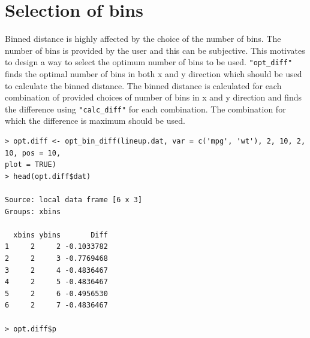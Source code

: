 \documentclass[article]{jss}
\begin{document}
\section{Selection of bins}\label{select-bins}

Binned distance is highly affected by the choice of the number of bins.
The number of bins is provided by the user and this can be subjective.
This motivates to design a way to select the optimum number of bins to
be used. \texttt{"opt\_diff"} finds the optimal number of bins in both x
and y direction which should be used to calculate the binned distance.
The binned distance is calculated for each combination of provided
choices of number of bins in x and y direction and finds the difference
using \texttt{"calc\_diff"} for each combination. The combination for
which the difference is maximum should be used.

%
%

\begin{verbatim}
> opt.diff <- opt_bin_diff(lineup.dat, var = c('mpg', 'wt'), 2, 10, 2, 10, pos = 10, 
plot = TRUE)
> head(opt.diff$dat)

Source: local data frame [6 x 3]
Groups: xbins

  xbins ybins       Diff
1     2     2 -0.1033782
2     2     3 -0.7769468
3     2     4 -0.4836467
4     2     5 -0.4836467
5     2     6 -0.4956530
6     2     7 -0.4836467

> opt.diff$p
\end{verbatim}
\end{document}
